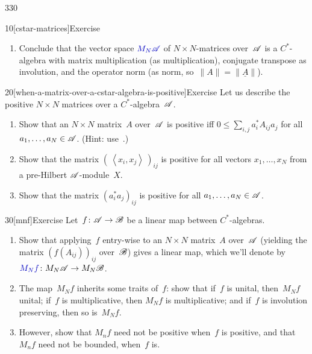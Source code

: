 \begin{parsec}{330}
\begin{point}{10}[cstar-matrices]{Exercise}
\begin{enumerate}
\item
Conclude that the vector space $\Define{M_N\scrA}$%
of $N\times N$-matrices over~$\mathscr{A}$
is a $C^*$-algebra
with matrix multiplication (as multiplication),
conjugate transpose as involution,
and the operator norm (as norm, so~$\|A\|=\|\underline{A}\|$).
\end{enumerate}
\end{point}
\begin{point}{20}[when-a-matrix-over-a-cstar-algebra-is-positive]{Exercise}%
Let us describe the positive  $N\times N$ matrices
over a $C^*$-algebra~$\mathscr{A}$.
\begin{enumerate}
\item
Show that an $N\times N$ matrix~$A$ over~$\mathscr{A}$
is positive iff $0\leq \sum_{i,j} a_i^* A_{ij} a_j$
for all~$a_1,\dotsc,a_N\in\mathscr{A}$.
(Hint: use~.)
\item
Show that the matrix $(\,\left<x_i,x_j\right>\,)_{ij}$
is positive for all vectors $x_1,\dotsc,x_N$
from a pre-Hilbert $\mathscr{A}$-module~$X$.
\item
Show that the matrix $(a^*_ia_j)_{ij}$
is positive for all $a_1,\dotsc,a_N\in\mathscr{A}$.
\end{enumerate}
\end{point}
\begin{point}{30}[mnf]{Exercise}%
Let~$f\colon \mathscr{A}\to\mathscr{B}$ be a linear map between $C^*$-algebras.
\begin{enumerate}
\item
Show that applying~$f$ entry-wise to an $N\times N$ matrix~$A$
over~$\mathscr{A}$ (yielding the matrix $(f(A_{ij}))_{ij}$ over~$\mathscr{B}$)
gives a linear map,
which we'll denote by~$\Define{M_Nf}\colon M_N\scrA\to M_N\scrB$.%
\item
The map~$M_Nf$ inherits some traits of~$f$:
show that if~$f$ is unital, then~$M_Nf$ unital;
if~$f$ is multiplicative, then $M_Nf$ is multiplicative; and
if~$f$ is involution preserving, then so is~$M_Nf$.
\item
However,
show that $M_nf$ need not be positive when~$f$ is positive,
and that~$M_nf$ need not be bounded, when~$f$ is.
\end{enumerate}
\end{point}
\end{parsec}
